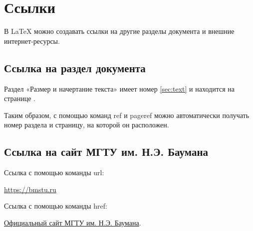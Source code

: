 \documentclass[a4paper,14 pt]{article}
\begin{document}
\section{Ссылки}

В LaTeX можно создавать ссылки на другие
разделы документа и внешние интернет-ресурсы.

\subsection{Ссылка на раздел документа}

Раздел «Размер и начертание текста»
имеет номер \ref{sec:text} и находится
на странице \pageref{sec:text}.

Таким образом, с помощью команд ref и pageref
можно автоматически получать номер раздела
и страницу, на которой он расположен.

\subsection{Ссылка на сайт МГТУ им. Н.Э. Баумана}

Ссылка с помощью команды url:

\url{https://bmstu.ru}

Ссылка с помощью команды href:

\href{https://bmstu.ru}
{Официальный сайт МГТУ им. Н.Э. Баумана}.
\end{document}

